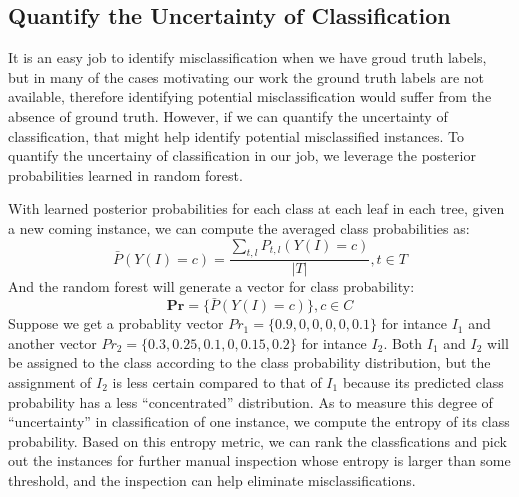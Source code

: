 
\subsection{Quantify the Uncertainty of Classification}
It is an easy job to identify misclassification when we have groud truth labels, but in many of the cases motivating
our work the ground truth labels are not available, therefore identifying potential misclassification
would suffer from the absence of ground truth. However, if we can quantify the uncertainty of classification, that might help identify potential misclassified instances. To quantify the uncertainy of classification in our job, we
leverage the posterior probabilities learned in random forest.

With learned posterior probabilities for each class at each leaf in each tree, given a new coming instance, we can compute the averaged class probabilities as:
\begin{displaymath}
\bar P(Y(I)=c) = \frac{\sum_{t,l} P_{t,l}(Y(I)=c)}{|T|}, t\in T
\end{displaymath}
And the random forest will generate a vector for class probability:
\begin{displaymath}
\textbf{Pr} = \{\bar P(Y(I)=c)\}, c\in C
\end{displaymath}
Suppose we get a probablity vector $Pr_{1} = \{0.9, 0, 0, 0, 0, 0.1\}$ for intance $I_{1}$ and another vector $Pr_{2} = \{0.3, 0.25, 0.1, 0, 0.15, 0.2\}$ for intance $I_{2}$. Both $I_{1}$ and $I_{2}$ will be assigned to the class according to the class probability distribution, but the assignment of $I_{2}$ is less certain compared to that of $I_{1}$ because its predicted class probability has a less ``concentrated'' distribution. As to measure this degree of ``uncertainty'' in classification of one instance, we compute the entropy of its class probability. Based on this entropy metric, we can rank the classfications and pick out the instances for further manual inspection whose entropy is larger than some threshold, and the inspection can help eliminate misclassifications.
